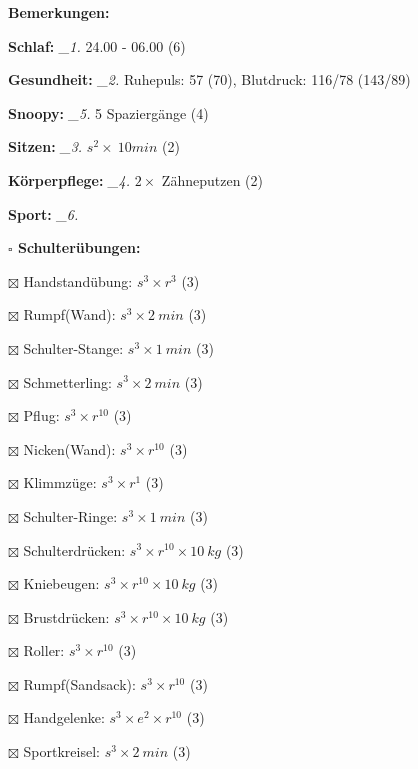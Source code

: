 \documentclass[10pt,a4paper]{article}
\newcommand\prop[1] {{\color {alizarin} {\bf #1}}}             %
\newcommand\mand[1] {{\color {burntorange} {\bf #1}}}          %
\newcommand\topspace{\vskip -15pt \hskip 20pt}
\newcommand\n[1] { {\sl #1.} \hskip 5pt }
\begin{document}
\begin{mdframed}[style=daystyle]
  \begin{labeling}{{\mand {Bemerkungen:}}}
    \setlength\itemsep{-3pt}
  \item[{\mand {Schlaf:}}]        \n{\_1} 24.00 - 06.00 (6)
  \item[{\mand {Gesundheit:}}]    \n{\_2} Ruhepuls: 57 (70), Blutdruck: 116/78 (143/89)
  \item[{\mand {Snoopy:}}]        \n{\_5} 5 Spaziergänge (4)
  \item[{\mand {Sitzen:}}]        \n{\_3} $s^2 \times\ 10 min$ (2)
  \item[{\mand {Körperpflege:}}]  \n{\_4} $2 \times$ Zähneputzen (2)
  \item[{\mand {Sport:}}]         \n{\_6}
    \topspace
    \begin{minipage}{0.75\textwidth}  
      \begin{labeling}{\prop {$\square$ {Schulterübungen:}}} 
        \setlength\itemsep{-3pt}
      \item[$\boxtimes$ Handstandübung:]  $s^3 \times r^{3}$ (3)
      \item[$\boxtimes$ Rumpf(Wand):]     $s^3 \times 2\ min$ (3)
      \item[$\boxtimes$ Schulter-Stange:] $s^3 \times 1\ min$ (3)
      \item[$\boxtimes$ Schmetterling:]   $s^3 \times 2\ min$ (3)
      \item[$\boxtimes$ Pflug:]           $s^3 \times r^{10}$ (3)
      \item[$\boxtimes$ Nicken(Wand):]    $s^3 \times r^{10}$ (3)
      \item[$\boxtimes$ Klimmzüge:]       $s^3 \times r^1$ (3)
      \item[$\boxtimes$ Schulter-Ringe:]  $s^3 \times 1\ min$ (3)
      \item[$\boxtimes$ Schulterdrücken:] $s^3 \times r^{10} \times 10\ kg$ (3)
      \item[$\boxtimes$ Kniebeugen:]      $s^3 \times r^{10} \times 10\ kg$ (3)
      \item[$\boxtimes$ Brustdrücken:]    $s^3 \times r^{10} \times 10\ kg$ (3)
      \item[$\boxtimes$ Roller:]          $s^3 \times r^{10}$ (3)
      \item[$\boxtimes$ Rumpf(Sandsack):] $s^3 \times r^{10}$ (3)
      \item[$\boxtimes$ Handgelenke:]     $s^3 \times e^2 \times r^{10}$ (3)
      \item[$\boxtimes$ Sportkreisel:]    $s^3 \times 2\ min$ (3)

\end{labeling}
\end{minipage}
\end{labeling}
\end{mdframed}
\end{document}
